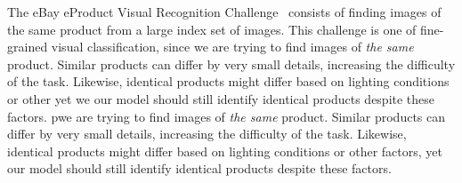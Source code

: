 \documentclass[conference]{IEEEtran}
\begin{document}
The eBay eProduct Visual Recognition Challenge~\cite{jiangbo2021ebay} consists of
finding images of the same product from a large index set of images.
This challenge is one of fine-grained visual classification, since we are trying to 
find images of \emph{the same} product. 
Similar products can differ by very small details, increasing the difficulty of the task.
Likewise, identical products might differ based on lighting conditions or other yet we 
our model should still identify identical products despite these factors.
 pwe are trying to 
 find images of \emph{the same} product. 
 Similar products can differ by very small details, increasing the difficulty of the task.
 Likewise, identical products might differ based on lighting conditions or other
 factors, yet our model should still identify identical products despite these factors.

\printbibliography
\end{document}
